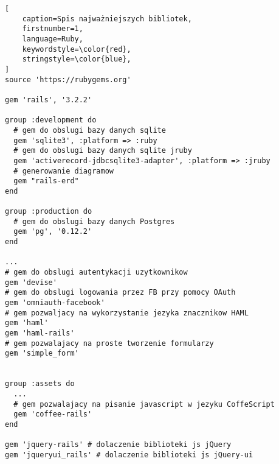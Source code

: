 
\begin{lstlisting}[
    caption=Spis najważniejszych bibliotek,
    firstnumber=1,
    language=Ruby,
    keywordstyle=\color{red},
    stringstyle=\color{blue},
]
source 'https://rubygems.org'

gem 'rails', '3.2.2'

group :development do
  # gem do obslugi bazy danych sqlite
  gem 'sqlite3', :platform => :ruby 
  # gem do obslugi bazy danych sqlite jruby
  gem 'activerecord-jdbcsqlite3-adapter', :platform => :jruby 
  # generowanie diagramow
  gem "rails-erd" 
end

group :production do
  # gem do obslugi bazy danych Postgres
  gem 'pg', '0.12.2' 
end

...
# gem do obslugi autentykacji uzytkownikow
gem 'devise' 
# gem do obslugi logowania przez FB przy pomocy OAuth
gem 'omniauth-facebook' 
# gem pozwaljacy na wykorzystanie jezyka znacznikow HAML
gem 'haml' 
gem 'haml-rails'
# gem pozwalajacy na proste tworzenie formularzy
gem 'simple_form' 


group :assets do
  ...
  # gem pozwalajacy na pisanie javascript w jezyku CoffeScript
  gem 'coffee-rails' 
end

gem 'jquery-rails' # dolaczenie biblioteki js jQuery
gem 'jqueryui_rails' # dolaczenie biblioteki js jQuery-ui

\end{lstlisting}





